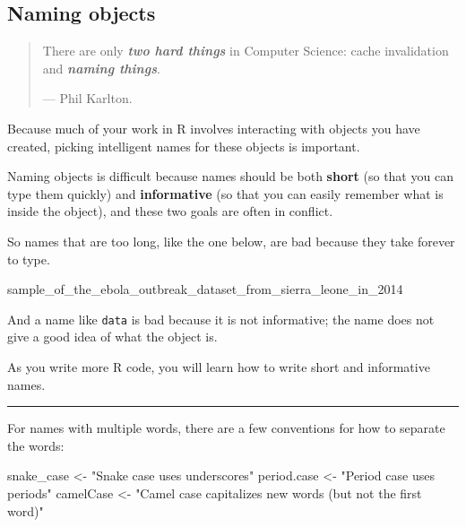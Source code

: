 \documentclass[
  letterpaper,
  DIV=11,
  numbers=noendperiod]{scrreprt}
\newenvironment{Shaded}{\begin{snugshade}}{\end{snugshade}}
\newcommand{\NormalTok}[1]{\textcolor[rgb]{0.00,0.23,0.31}{#1}}
\newcommand{\OtherTok}[1]{\textcolor[rgb]{0.00,0.23,0.31}{#1}}
\newcommand{\StringTok}[1]{\textcolor[rgb]{0.13,0.47,0.30}{#1}}
\begin{document}
\subsection{Naming objects}\label{naming-objects}

\begin{quote}
There are only \textbf{\emph{two hard things}} in Computer Science:
cache invalidation and \textbf{\emph{naming things}}.

--- Phil Karlton.
\end{quote}

Because much of your work in R involves interacting with objects you
have created, picking intelligent names for these objects is important.

Naming objects is difficult because names should be both \textbf{short}
(so that you can type them quickly) and \textbf{informative} (so that
you can easily remember what is inside the object), and these two goals
are often in conflict.

So names that are too long, like the one below, are bad because they
take forever to type.

\begin{Shaded}
\begin{Highlighting}[]
\NormalTok{sample\_of\_the\_ebola\_outbreak\_dataset\_from\_sierra\_leone\_in\_2014}
\end{Highlighting}
\end{Shaded}

And a name like \texttt{data} is bad because it is not informative; the
name does not give a good idea of what the object is.

As you write more R code, you will learn how to write short and
informative names.

\begin{center}\rule{0.5\linewidth}{0.5pt}\end{center}

For names with multiple words, there are a few conventions for how to
separate the words:

\begin{Shaded}
\begin{Highlighting}[]
\NormalTok{snake\_case }\OtherTok{\textless{}{-}} \StringTok{"Snake case uses underscores"}
\NormalTok{period.case }\OtherTok{\textless{}{-}} \StringTok{"Period case uses periods"}
\NormalTok{camelCase }\OtherTok{\textless{}{-}} \StringTok{"Camel case capitalizes new words (but not the first word)"}
\end{Highlighting}
\end{Shaded}
\end{document}
